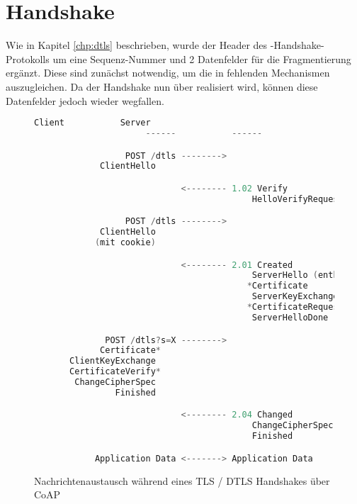 \section{Handshake}

Wie in Kapitel \ref{chp:dtls} beschrieben, wurde der Header des -Handshake-Protokolls um eine Sequenz-Nummer
und 2 Datenfelder für die Fragmentierung ergänzt. Diese sind zunächst notwendig, um die in  fehlenden Mechanismen
auszugleichen. Da der Handshake nun über  realisiert wird, können diese Datenfelder jedoch wieder wegfallen.


\begin{figure}[ht]
  \centering
  \begin{lstlisting}[language=c]
                      Client           Server
                      ------           ------

                  POST /dtls -------->
             ClientHello

                             <-------- 1.02 Verify
                                           HelloVerifyRequest

                  POST /dtls -------->
             ClientHello
            (mit cookie)

                             <-------- 2.01 Created
                                           ServerHello (enthält Session X)
                                          *Certificate
                                           ServerKeyExchange
                                          *CertificateRequest
                                           ServerHelloDone

              POST /dtls?s=X -------->
             Certificate*
       ClientKeyExchange
       CertificateVerify*
        ChangeCipherSpec
                Finished

                             <-------- 2.04 Changed
                                           ChangeCipherSpec
                                           Finished

            Application Data <-------> Application Data
  \end{lstlisting}
  \caption{Nachrichtenaustausch während eines TLS / DTLS Handshakes über CoAP}
  \label{fig:newhandshake}
\end{figure}
